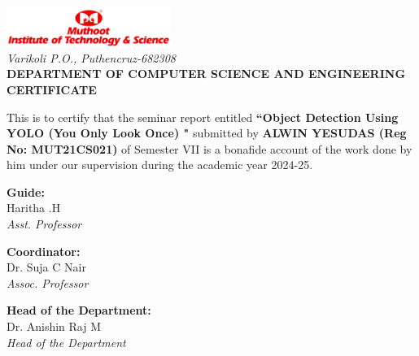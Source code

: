\documentclass[a4paper,12pt]{template}
\begin{document}
\begin{center}
    \includegraphics[width=0.4\textwidth]{images/Mits Logo.jpg}\\[0.5cm]
    \textit{Varikoli P.O., Puthencruz-682308}\\[2cm]
    
    {\Large \textbf{DEPARTMENT OF COMPUTER SCIENCE AND ENGINEERING}}\\[2cm]
    
    {\LARGE \textbf{CERTIFICATE}}\\[1cm]
\end{center}

\vspace{0.4cm}
\noindent
This is to certify that the seminar report entitled \textbf{``Object Detection Using YOLO (You Only Look Once) "} submitted by \textbf{ALWIN YESUDAS (Reg No: MUT21CS021)} of Semester VII is a bonafide account of the work done by him under our supervision during the academic year 2024-25.

\vspace{3cm}
\noindent
\begin{center}
\begin{minipage}[t]{0.3\textwidth}
    \textbf{Guide:}\\[2cm]
    Haritha .H\\
    \textit{Asst. Professor}
\end{minipage}
\hfill
\begin{minipage}[t]{0.3\textwidth}
    \textbf{Coordinator:}\\[2cm]
    Dr. Suja C Nair\\
    \textit{Assoc. Professor}\\[2cm]
\end{minipage}
\hfill
\begin{minipage}[t]{0.3\textwidth}
    \textbf{Head of the Department:}\\[2cm]
    Dr. Anishin Raj M\\
    \textit{Head of the Department}
\end{minipage}
\end{center}
\end{document}
